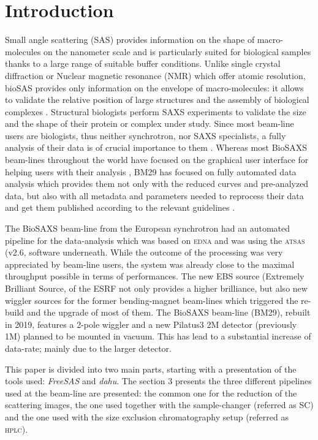 \documentclass[preprint]{iucr}              %
\begin{document}
\section{Introduction}
Small angle scattering (SAS) provides information on the shape of macro-molecules on the nanometer scale and is particularly suited for biological samples thanks to a large range of suitable buffer conditions.
Unlike single crystal diffraction or Nuclear magnetic resonance (NMR) which offer atomic resolution, bioSAS provides only information on the envelope of macro-molecules: it allows to validate the relative position of large structures and the assembly of biological complexes \cite{biosaxs_rev2018}. 
Structural biologists perform SAXS experiments to validate the size and the shape of their protein or complex under study. 
Since most beam-line users are biologists, thus neither synchrotron, nor SAXS specialists, a fully analysis of their data is of crucial importance to them \cite{shibom}. 
Whereas most BioSAXS beam-lines throughout the world have focused on the graphical user interface for helping users with their analysis \cite{dawn, als-biosaxs}, BM29 has focused on fully automated data analysis which provides them not only with the reduced curves and pre-analyzed data, but also with all metadata and parameters needed to reprocess their data and get them published according to the relevant guidelines \cite{guidelines_2017}.

The BioSAXS beam-line from the European synchrotron \cite{BM29paper} had an automated pipeline for the data-analysis which was based on \textsc{edna} \cite{edna} and was using the \textsc{atsas} (v2.6,  software underneath. 
While the outcome of the processing was very appreciated by beam-line users, the system was already close to the maximal throughput possible in terms of performances. 
The new EBS source (Extremely Brilliant Source,  of the ESRF not only provides a higher brilliance, but also new wiggler sources for the former bending-magnet beam-lines which triggered the re-build and the upgrade of most of them. 
The BioSAXS beam-line (BM29), rebuilt in 2019, features a 2-pole wiggler and a new Pilatus3 2M detector (previously 1M) planned to be mounted in vacuum. 
This has lead to a substantial increase of data-rate; mainly due to the larger detector. 

This paper is divided into two main parts, starting with a presentation of the tools used: \textit{FreeSAS} and \textit{dahu}.
The section 3 presents the three different pipelines used at the beam-line are presented: the common one for the reduction of the scattering images, the one used together with the sample-changer (referred as SC) and the one used with the size exclusion chromatography setup (referred as \textsc{hplc}).
\end{document}

